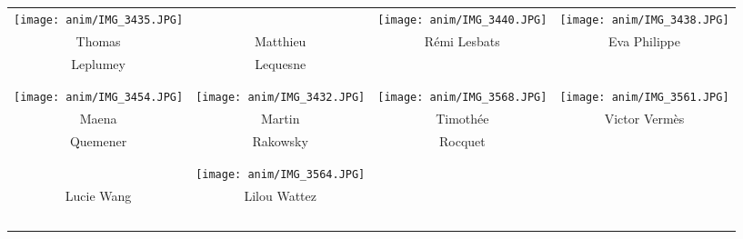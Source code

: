 \vfill
\vspace{2mm}
\begin{center}
\begin{tabular}{cccc}
\texttt{[image: anim/IMG\_3435.JPG]} &
&
\texttt{[image: anim/IMG\_3440.JPG]} &
\texttt{[image: anim/IMG\_3438.JPG]} \\

Thomas & Matthieu & Rémi Lesbats & Eva Philippe \\ Leplumey & Lequesne & & \\ \\ \\ 

\texttt{[image: anim/IMG\_3454.JPG]} &
\texttt{[image: anim/IMG\_3432.JPG]} &
\texttt{[image: anim/IMG\_3568.JPG]} &
\texttt{[image: anim/IMG\_3561.JPG]} \\

Maena & Martin & Timothée & Victor Vermès \\ Quemener & Rakowsky & Rocquet &  \\ \\ \\ 

&
\texttt{[image: anim/IMG\_3564.JPG]}  \\

Lucie Wang & Lilou Wattez \\\



\end{tabular}
\end{center}
